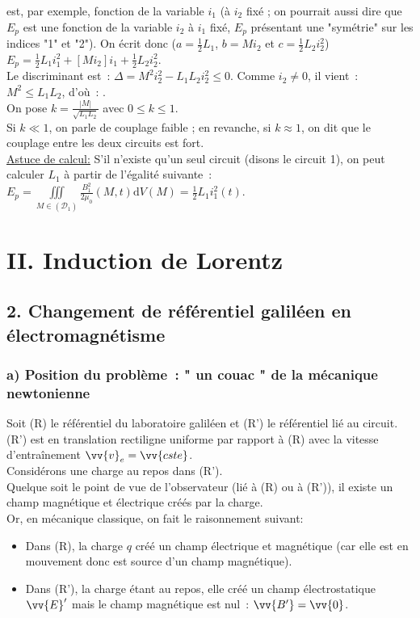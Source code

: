 \documentclass{article}
\let\oldiiint\iiint
\renewcommand{\iiint}{\oldiiint\limits}
\renewcommand\overrightarrow{\vv}
\begin{document}
est, par exemple, fonction de la variable $i_{1}$ (à $i_{2}$ fixé ;
on pourrait aussi dire que $E_{p}$ est une fonction de la variable
$i_{2}$ à $i_{1}$ fixé, $E_{p}$ présentant une "symétrie" sur les
indices "1" et "2"). On écrit donc ($a = \frac{1}{2}L_{1}$,
$b=Mi_{2}$ et $c=\frac{1}{2}L_{2}i_{2}^{2}$) $E_{p} =
\frac{1}{2}L_{1}i_{1}^{2}+\left[Mi_{2}\right]i_{1}+ \frac{1}{2}L_{2}i_{2}^{2}$.
\\
Le discriminant est : $\Delta = M^{2}i_{2}^{2}-L_{1}L_{2}i_{2}^{2}
\leq 0$. Comme $i_{2} \neq 0$, il vient : $M^{2} \leq L_{1}L_{2}$,
d'où : . \\
On pose $k = \frac{|M|}{\sqrt{L_{1}L_{2}}}$ avec $0 \leq k \leq 1$.
\\
Si $k\ll 1$, on parle de couplage faible ; en revanche, si $k \approx
1$, on dit que le couplage entre les deux circuits est fort. \\
\underline{Astuce de calcul:} S'il n'existe qu'un seul circuit
(disons le circuit 1), on peut calculer $L_{1}$ à partir de
l'égalité suivante : $E_{p} = \iiint_{M\in
\left(\mathcal{D}_{1}\right)}\frac{B_{1}^{2}}{2\mu_{0}}\left(M,t\right)\mathrm{d}V\left(M\right)=\frac{1}{2}L_{1}i_{1}^{2}\left(t\right)$.

\section*{II. Induction de Lorentz}
\subsection*{2. Changement de référentiel galiléen en électromagnétisme}
\subsubsection*{a) Position du problème : " un couac " de la mécanique
newtonienne}
Soit (R) le référentiel du laboratoire galiléen et (R') le
référentiel lié au circuit. (R') est en translation rectiligne
uniforme par rapport à
(R) avec la vitesse d'entraînement $\overrightarrow{v}_{e}=\overrightarrow{cste}$. \\
Considérons une charge au repos dans (R').\\
Quelque soit le point de vue de l'observateur (lié à (R) ou à (R')),
il existe un champ magnétique et électrique créés par la charge. \\
Or, en mécanique classique, on fait le raisonnement suivant:
\begin{itemize}
\item Dans (R), la charge $q$ créé un champ électrique et magnétique
(car elle est en mouvement donc est source d'un champ magnétique).
\item Dans (R'), la charge étant au repos, elle créé un champ
électrostatique $\overrightarrow{E}'$ mais le champ magnétique est
nul : $\overrightarrow{B'}  = \overrightarrow{0}$.
\end{itemize}
\end{document}
